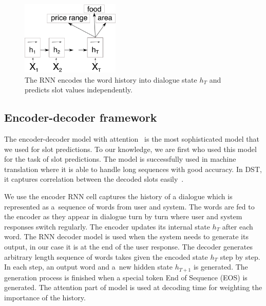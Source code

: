 \documentclass{itatnew}
\begin{document}
\begin{figure}
\begin{center}
\includegraphics[height=9.5em]{encoder}
\caption{The RNN encodes the word history into dialogue state $h_T$ and predicts slot values independently.}
\end{center}
\vspace{-0.80em}
\label{fig:encind}
\end{figure}

\subsection{Encoder-decoder framework}
\label{sec:encdec}
The encoder-decoder model with attention~\cite{bahdanau2014neural} is the most sophisticated model that we used for slot predictions.
To our knowledge, we are first who used this model for the task of slot predictions.
The model is successfully used in machine translation where it is able to handle long sequences with good accuracy.
In DST, it captures correlation between the decoded slots easily~\cite{bahdanau2014neural}. 

We use the encoder RNN cell captures the history of a dialogue which is represented as a~sequence of words from user and system.
The words are fed to the encoder as they appear in dialogue turn by turn where user and system responses switch regularly.
The encoder updates its internal state $h_T$ after each word.
The RNN decoder model is used when the system needs to generate its output, in our case it is at the end of the user response.
The decoder generates arbitrary length sequence of words takes given the encoded state $h_T$ step by step.
In each step, an output word and a~new hidden state $h_{T+1}$ is generated.
The generation process is finished when a special token End of Sequence (EOS) is generated.
The attention part of model is used at decoding time for weighting the importance of the history. 
\end{document}

